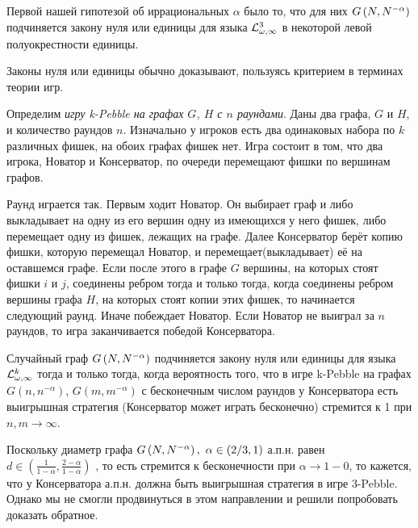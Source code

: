 Первой нашей гипотезой об иррациональных $\alpha$ было то, что для них $G\left(N,N^{-\alpha}\right)$ подчиняется закону нуля или единицы для языка $\mathcal{L}^3_{\omega, \infty}$ в некоторой левой полуокрестности единицы.

Законы нуля или единицы обычно доказывают, пользуясь критерием в терминах теории игр.

Определим \textit{игру k-Pebble на графах $G$, $H$ с $n$ раундами}.
Даны два графа, $G$ и $H$, и количество раундов $n$.
Изначально у игроков есть два одинаковых набора по $k$ различных фишек, на обоих графах фишек нет.
Игра состоит в том, что два игрока, Новатор и Консерватор, по очереди перемещают фишки по вершинам графов.%

Раунд играется так. 
Первым ходит Новатор.
Он выбирает граф и либо выкладывает на одну из его вершин одну из имеющихся у него фишек, либо перемещает одну из фишек, лежащих на графе.
Далее Консерватор берёт копию фишки, которую перемещал Новатор, и перемещает(выкладывает) её на оставшемся графе.
Если после этого в графе $G$ вершины, на которых стоят фишки $i$ и $j$, соединены ребром тогда и только тогда, когда соединены ребром вершины графа $H$, на которых стоят копии этих фишек, то начинается следующий раунд.
Иначе побеждает Новатор.
Если Новатор не выиграл за $n$ раундов, то игра заканчивается победой Консерватора.

\begin{theorem} \cite{zhukovskii2012zero}
Случайный граф $G\left(N,N^{-\alpha}\right)$ подчиняется закону нуля или единицы для языка $\mathcal{L}^k_{\omega, \infty}$ тогда и только тогда, когда вероятность того, что в игре k-Pebble на графах $G(n, n^{-\alpha})$, $G(m, m^{-\alpha})$  с бесконечным числом раундов у Консерватора есть выигрышная стратегия (Консерватор может играть бесконечно) стремится к 1 при $n,m \rightarrow \infty$.
\end{theorem}

Поскольку диаметр графа $G\left(N,N^{-\alpha}\right),~ \alpha \in (2/3, 1)$ а.п.н. равен $d \in \left(\frac{1}{1-\alpha}, \frac{2-\alpha}{1-\alpha}\right)$ \cite{bollobas2001random}, то есть стремится к бесконечности при $\alpha \rightarrow 1 - 0$, то кажется, что у Консерватора а.п.н. должна быть выигрышная стратегия в игре 3-Pebble.
Однако мы не смогли продвинуться в этом направлении и решили попробовать доказать обратное.

